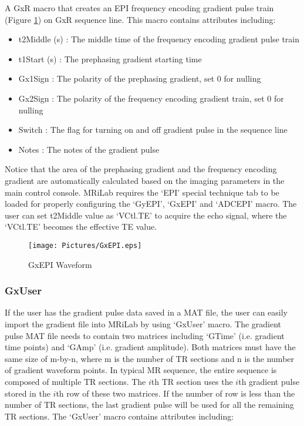 \documentclass{book}%
\begin{document}
A GxR macro that creates an EPI frequency encoding gradient pulse train (Figure \ref{fig:GxEPI}) on GxR sequence line. This macro contains attributes including:

\begin{itemize}
	\item t2Middle (s) : The middle time of the frequency encoding gradient pulse train
	\item t1Start (s) : The prephasing gradient starting time
	\item Gx1Sign : The polarity of the prephasing gradient, set 0 for nulling
	\item Gx2Sign : The polarity of the frequency encoding gradient train, set 0 for nulling
	\item Switch : The flag for turning on and off gradient pulse in the sequence line
	\item Notes : The notes of the gradient pulse 
\end{itemize}

Notice that the area of the prephasing gradient and the frequency encoding gradient are automatically calculated based on the imaging parameters in the main control console. MRiLab requires the `EPI' special technique tab to be loaded for properly configuring the `GyEPI', `GxEPI' and `ADCEPI' macro. The user can set t2Middle value as `VCtl.TE' to acquire the echo signal, where the `VCtl.TE' becomes the effective TE value.

\begin{figure}[htbp]
	\centering
		\texttt{[image: Pictures/GxEPI.eps]}
	\caption{GxEPI Waveform}
	\label{fig:GxEPI}
\end{figure}

\subsubsection{GxUser}

If the user has the gradient pulse data saved in a MAT file, the user can easily import the gradient file into MRiLab by using `GxUser' macro. The gradient pulse MAT file needs to contain two matrices including `GTime' (i.e. gradient time points) and `GAmp' (i.e. gradient amplitude). Both matrices must have the same size of m-by-n, where m is the number of TR sections and n is the number of gradient waveform points. In typical MR sequence, the entire sequence is composed of multiple TR sections. The $i$th TR section uses the $i$th gradient pulse stored in the $i$th row of these two matrices. If the number of row is less than the number of TR sections, the last gradient pulse will be used for all the remaining TR sections. The `GxUser' macro contains attributes including:
\end{document}
